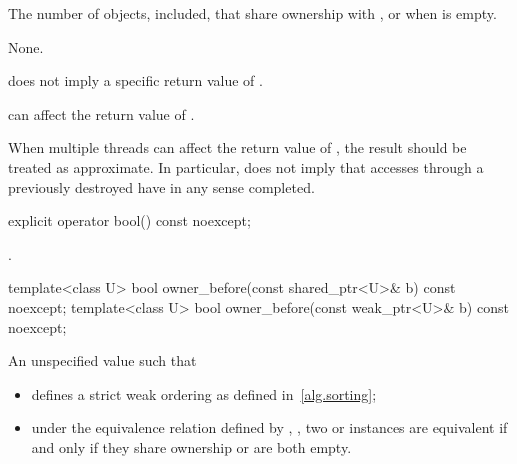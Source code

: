 \begin{itemdescr}
\pnum
\returns
The number of  objects,  included,
that share ownership with , or  when  is
empty.

\pnum
\sync
None.

\pnum
\begin{note}
does not imply a specific return value of .
\end{note}

\pnum
\begin{note}
can affect the return value of .
\end{note}

\pnum
\begin{note}
When multiple threads
can affect the return value of ,
the result should be treated as approximate.
In particular,  does not imply that accesses through
a previously destroyed  have in any sense completed.
\end{note}
\end{itemdescr}

%
\begin{itemdecl}
explicit operator bool() const noexcept;
\end{itemdecl}

\begin{itemdescr}
\pnum
\returns
{}.
\end{itemdescr}

\begin{indexed}{}
\begin{itemdecl}
template<class U> bool owner_before(const shared_ptr<U>& b) const noexcept;
template<class U> bool owner_before(const weak_ptr<U>& b) const noexcept;
\end{itemdecl}
\end{indexed}

\begin{itemdescr}
\pnum
\returns
An unspecified value such that
\begin{itemize}
\item {} defines a strict weak ordering as defined in~\ref{alg.sorting};

\item under the equivalence relation defined by ,
, two  or
 instances are equivalent if and only if they share ownership or
are both empty.
\end{itemize}

\end{itemdescr}

